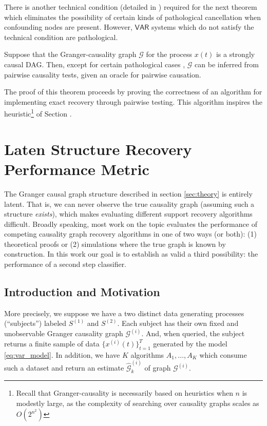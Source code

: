 \documentclass[12pt]{article}
\def\gcg{\mathcal{G}}  %
\def\VAR{\mathsf{VAR}}  %
\begin{document}
  There is another technical condition (detailed in
  \cite{my_GC_paper}) required for the next theorem which eliminates
  the possibility of certain kinds of pathological cancellation when
  confounding nodes are present.  However, $\VAR$ systems which do not
  satisfy the technical condition are pathological.

  \begin{theorem}
    \label{thm:scg_recovery}
    Suppose that the Granger-causality graph $\gcg$ for the process
    $x(t)$ is a strongly causal DAG.  Then, except for certain
    pathological cases \cite{my_GC_paper}, $\gcg$ can be inferred from
    pairwise causality tests, given an oracle for pairwise causation.
  \end{theorem}

  The proof of this theorem proceeds by proving the correctness of an
  algorithm for implementing exact recovery through pairwise testing.
  This algorithm inspires the heuristic\footnote{Recall that
    Granger-causality is necessarily based on heuristics when $n$ is
    modestly large, as the complexity of searching over causality
    graphs scales as $O(2^{n^2})$} of Section
  \cite{sec:structure_learning}.

\section{Laten Structure Recovery Performance Metric}
The Granger causal graph structure described in section
\ref{sec:theory} is entirely latent.  That is, we can never observe
the true causality graph (assuming such a structure \textit{exists}),
which makes evaluating different support recovery algorithms
difficult.  Broadly speaking, most work on the topic evaluates the
performance of competing causality graph recovery algorithms in one of
two ways (or both): (1) theoretical proofs or (2) simulations where
the true graph is known by construction.  In this work our goal is to
establish as valid a third possibility: the performance of a second
step classifier.

\subsection{Introduction and Motivation}
More precisely, we suppose we have a two distinct data generating
processes (``subjects'') labeled $S^{(1)}$ and $S^{(2)}$.  Each
subject has their own fixed and unobservable Granger causality graph
$\gcg^{(i)}$.  And, when queried, the subject returns a finite sample
of data $\{x^{(i)}(t)\}_{t = 1}^{T}$ generated by the model
\ref{eq:var_model}.  In addition, we have $K$ algorithms
$A_1, \ldots, A_K$ which consume such a dataset and return an estimate
$\widehat{\gcg}_k^{(i)}$ of graph $\gcg^{(i)}$.
\end{document}
